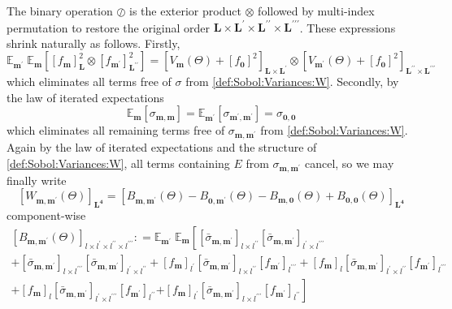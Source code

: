 \documentclass[preprint,12pt]{elsarticle}
\newcommand*{\M}[1]{\ensuremath{#1}\xspace}
\newcommand*{\x}{\times}
\newcommand*{\mi}[1]{\mathbf{#1}}
\newcommand*{\te}[2][]{\left\lbrack{#2}\right\rbrack_{#1}}
\newcommand*{\deq}{\M{\mathrel{\mathop:}=}}
\newcommand*{\ev}[3][]{\mathbb{E}_{#3}^{#1}\!\left\lbrack{#2}\right\rbrack}
\newcommand*{\evt}[3][]{\mathbb{E}_{#3}^{#1}\!#2}
\begin{document}
        The binary operation $\oslash$ is the exterior product $\otimes$ followed by multi-index permutation to restore the original order $\mi{L\x L^{\prime}\x L^{\prime\prime}\x L^{\prime\prime\prime}}$.
        These expressions shrink naturally as follows. Firstly,
        \begin{equation*}
            \evt{\;\ev{\te[\mi{L}]{f_{\mi{m}}}^{2} \otimes \te[\mi{L^{\prime\prime}}]{f_{\mi{m^{\prime}}}}^{2}}{\mi{m}}}{\mi{m^{\prime}}} = \te[\mi{L\x L^{\prime}}]{{V_{\mi{m}}(\Theta)} + \te[\,]{f_{\mi{0}}}^{2}} \otimes
            \te[\mi{L^{\prime\prime}\x L^{\prime\prime\prime}}]{{V_{\mi{m^{\prime}}}(\Theta)} + \te[\,]{f_{\mi{0}}}^{2}}
        \end{equation*}
        which eliminates all terms free of $\sigma$ from \cref{def:Sobol:Variances:W}. Secondly, by the law of iterated expectations
        \begin{equation*}
            \ev{\sigma_{\mi{m,m}}}{\mi{m}} = \ev{\sigma_{\mi{m^{\prime},m^{\prime}}}}{\mi{m^{\prime}}} = \sigma_{\mi{0,0}}
        \end{equation*}
        which eliminates all remaining terms free of $\sigma_{\mi{m,m^{\prime}}}$ from \cref{def:Sobol:Variances:W}. Again by the law of iterated expectations and the structure of \cref{def:Sobol:Variances:W}, all terms containing $E$ from $\sigma_{\mi{m,m^{\prime}}}$ cancel, so we may finally write
        \begin{equation} \label{def:Sobol:Variances:W2}
            \te[\mi{L^4}]{W_{\mi{m},\mi{m^{\prime}}}(\Theta)} = \te[\mi{L^4}]{B_{\mi{m,m^{\prime}}}(\Theta)-B_{\mi{0,m^{\prime}}}(\Theta)-B_{\mi{m,0}}(\Theta)+B_{\mi{0,0}}(\Theta)}
        \end{equation}
        component-wise
        \begin{multline*}
            \te[l\x l^{\prime}\x l^{\prime\prime}\x l^{\prime\prime\prime}]{B_{\mi{m},\mi{m^{\prime}}}(\Theta)} 
            \deq \evt{\;\evt{\left\lbrack
            \te[l\x l^{\prime\prime}]{\bar{\sigma}_{\mi{m,m^{\prime}}}} \te[l^{\prime}\x l^{\prime\prime\prime}]{\bar{\sigma}_{\mi{m,m^{\prime}}}}\right. \\
            +\te[l\x l^{\prime\prime\prime}]{\bar{\sigma}_{\mi{m,m^{\prime}}}} \te[l^{\prime}\x l^{\prime\prime}]{\bar{\sigma}_{\mi{m,m^{\prime}}}}
            +\te[l^{\prime}]{f_{\mi{m}}} \te[l\x l^{\prime\prime}]{\bar{\sigma}_{\mi{m,m^{\prime}}}} \te[l^{\prime\prime\prime}]{f_{\mi{m^{\prime}}}}
            +\te[l]{f_{\mi{m}}} \te[l^{\prime}\x l^{\prime\prime}]{\bar{\sigma}_{\mi{m,m^{\prime}}}} \te[l^{\prime\prime\prime}]{f_{\mi{m^{\prime}}}}\\
            +\te[l]{f_{\mi{m}}} \te[l^{\prime}\x l^{\prime\prime\prime}]{\bar{\sigma}_{\mi{m,m^{\prime}}}} \te[l^{\prime\prime}]{f_{\mi{m^{\prime}}}}
            \left. +\te[l^{\prime}]{f_{\mi{m}}} \te[l\x l^{\prime\prime\prime}]{\bar{\sigma}_{\mi{m,m^{\prime}}}} \te[l^{\prime\prime}]{f_{\mi{m^{\prime}}}}
            \right\rbrack}{\mi{m}}}{\mi{m^{\prime}}} 
        \end{multline*}
\end{document}
